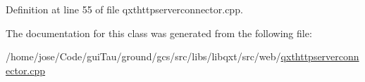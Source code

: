 Definition at line 55 of file qxthttpserverconnector.\-cpp.



The documentation for this class was generated from the following file\-:\begin{DoxyCompactItemize}
\item 
/home/jose/\-Code/gui\-Tau/ground/gcs/src/libs/libqxt/src/web/\hyperlink{qxthttpserverconnector_8cpp}{qxthttpserverconnector.\-cpp}\end{DoxyCompactItemize}
